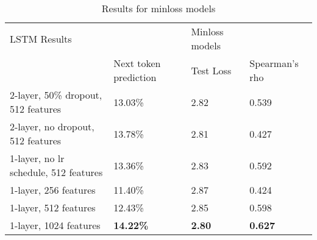 \begin{table}[!ht]
  \centering
\begin{tabular}{|l|lll|}
\hline
LSTM Results                          &                                                     & Minloss models                     &                \\ \cline{2-4}
                                      & \multicolumn{1}{l|}{Next token prediction}          & \multicolumn{1}{l|}{Test Loss}     & Spearman's rho \\ \hline
2-layer, 50\% dropout, 512 features   & \multicolumn{1}{l|}{13.03\%}                        & \multicolumn{1}{l|}{2.82}          & 0.539          \\ \hline
2-layer, no dropout, 512 features     & \multicolumn{1}{l|}{13.78\%}                        & \multicolumn{1}{l|}{2.81}          & 0.427          \\ \hline
1-layer, no lr schedule, 512 features & \multicolumn{1}{l|}{13.36\%}                        & \multicolumn{1}{l|}{2.83}          & 0.592          \\ \hline
1-layer, 256 features                 & \multicolumn{1}{l|}{11.40\%}                        & \multicolumn{1}{l|}{2.87}          & 0.424          \\ \hline
1-layer, 512 features                 & \multicolumn{1}{l|}{12.43\%}                        & \multicolumn{1}{l|}{2.85}          & 0.598          \\ \hline
1-layer, 1024 features                & \multicolumn{1}{l|}{\textbf{14.22\%}}               & \multicolumn{1}{l|}{\textbf{2.80}} & \textbf{0.627} \\ \hline
\end{tabular}
\caption{Results for minloss models}
\label{tab:minloss}
\end{table}
